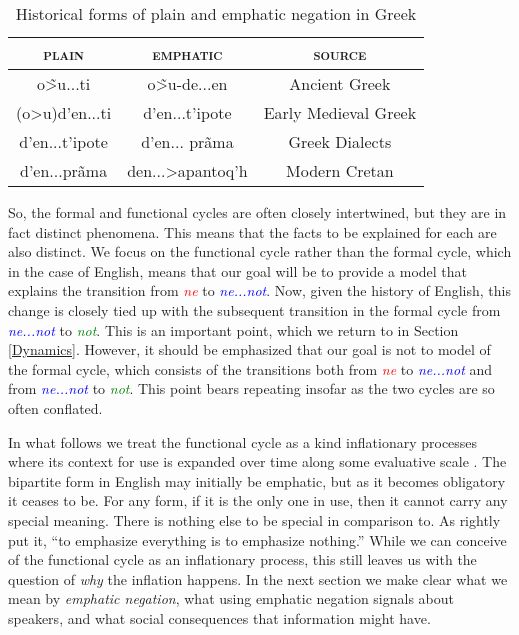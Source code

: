 \documentclass[linguex]{sp}
\theoremstyle{definition} \newtheorem{definition}{Definition}
\begin{document}
\begin{table}
\begin{center}
\begin{tabular}{ccc}
\toprule
\cmidrule(r){1-2}
\textsc{plain} & \textsc{emphatic} & \textsc{source} \\
\midrule
      \textgreek{o\~>u...ti} & \textgreek{o\~>u-de...en} & Ancient Greek \\
      \textgreek{(o>u)d'en...ti} & \textgreek{d'en...t'ipote} & Early Medieval Greek \\
      \textgreek{d'en...t'ipote} & \textgreek{d'en... pr\~ama} & Greek Dialects \\
      \textgreek{d'en...pr\~ama} & \textgreek{den...>apantoq'h} & Modern Cretan \\
\bottomrule
\end{tabular}
\end{center}
    \caption{Historical forms of plain and emphatic negation in Greek}
    \label{greek-table}

\end{table}

So, the formal and functional cycles are often closely intertwined, but they are in fact distinct phenomena. This means that the facts to be explained for each are also distinct.  We focus on the functional cycle rather than the formal cycle, which in the case of English, means that our goal will be to provide a model that explains the transition from \emph{\textcolor{red}{ne}} to \emph{\textcolor{blue}{ne...not}}. Now, given the history of English, this change is closely tied up with the subsequent transition in the formal cycle from \emph{\textcolor{blue}{ne...not}}  to  \emph{\textcolor{green}{not}}. This is an important point, which we return to in Section \ref{Dynamics}. However, it should be emphasized that our goal is not to model of the formal cycle, which consists of the transitions both from \emph{\textcolor{red}{ne}} to \emph{\textcolor{blue}{ne...not}} and from \emph{\textcolor{blue}{ne...not}}  to  \emph{\textcolor{green}{not}}. This point bears repeating insofar as the two cycles are so often conflated.

In what follows  we treat the functional cycle as a kind inflationary processes where its context for use is expanded over time along some evaluative scale \citep{dahl:2001}. The bipartite form in English may initially be emphatic, but as it becomes obligatory it ceases to be. For any form, if it is the only one in use, then it cannot carry any special meaning. There is nothing else to be special in comparison to. As \citet[5]{kiparsky-condoravdi:2006} rightly put it, ``to emphasize everything is to emphasize nothing.''  While we can conceive of the functional cycle as an inflationary process, this still leaves us with the question of \emph{why} the inflation happens. In the next section we make clear what we mean by \emph{emphatic negation}, what using emphatic negation signals about speakers, and what social consequences that information might have.
\end{document}
